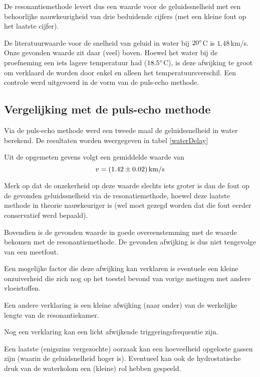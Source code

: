 De resonantiemethode levert dus een waarde voor de geluidssnelheid met een 
behoorlijke nauwkeurigheid van drie beduidende cijfers (met een kleine fout 
op het laatste cijfer).

De literatuurwaarde voor de snelheid van geluid in water bij $20^\circ$C is 
$1.48\,$km/s. Onze gevonden waarde zit daar (veel) boven. Hoewel het water 
bij de proefneming een iets lagere temperatuur had ($18.5^\circ$C), is deze 
afwijking te groot om verklaard de worden door enkel en alleen het 
temperatuursverschil. Een controle werd uitgevoerd in de vorm van de 
puls-echo methode.

\subsection{Vergelijking met de puls-echo methode}
Via de puls-echo methode werd een tweede maal de geluidssnelheid in water 
berekend. De resultaten worden weergegeven in tabel \ref{waterDelay}

\waterDelay

Uit de opgemeten gevens volgt een gemiddelde waarde van
$$
v = (1.42 \pm 0.02)\,\rm km/s
$$

Merk op dat de onzekerheid op deze waarde slechts iets groter is dan de 
fout op de gevonden geluidssnelheid via de resonatiemethode, hoewel deze 
laatste methode in theorie nauwkeuriger is (wel moet gezegd worden dat die 
fout eerder conservatief werd bepaald).

Bovendien is de gevonden waarde in goede overeenstemming met de waarde 
bekomen met de resonantiemethode. De gevonden afwijking is dus niet 
tengevolge van een meetfout.

Een mogelijke factor die deze afwijking kan verklaren is eventuele een 
kleine onzuiverheid die zich nog op het toestel bevond van vorige metingen 
met andere vloeistoffen.

Een andere verklaring is een kleine afwijking (naar onder) van de 
werkelijke lengte van de resonantiekamer.

Nog een verklaring kan een licht afwijkende triggeringsfrequentie zijn.

Een laatste (enigszins vergezochte) oorzaak kan een hoeveelheid opgeloste 
gassen zijn (waarin de geluidsnelheid hoger is). Eventueel kan ook de 
hydrostatische druk van de waterkolom een (kleine) rol hebben gespeeld.






